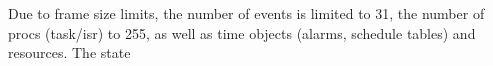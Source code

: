 Due to frame size limits, the number of events is limited to 31, the number of procs (task/isr) to 255, as well as time objects (alarms, schedule tables) and resources.
The state 

